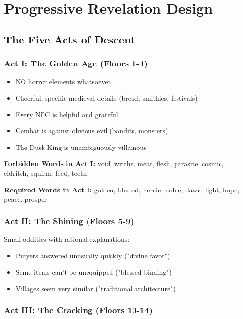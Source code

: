 \documentclass[11pt,a4paper,twoside]{book}
\begin{document}
\chapter{Progressive Revelation Design}

\section{The Five Acts of Descent}

\subsection{Act I: The Golden Age (Floors 1-4)}

\begin{tcolorbox}[heroicbox={Design Principles}]
\begin{itemize}
    \item NO horror elements whatsoever
    \item Cheerful, specific medieval details (bread, smithies, festivals)
    \item Every NPC is helpful and grateful
    \item Combat is against obvious evil (bandits, monsters)
    \item The Dusk King is unambiguously villainous
\end{itemize}
\end{tcolorbox}

\textbf{Forbidden Words in Act I:}
void, writhe, meat, flesh, parasite, cosmic, eldritch, squirm, feed, teeth

\textbf{Required Words in Act I:}
golden, blessed, heroic, noble, dawn, light, hope, peace, prosper

\subsection{Act II: The Shining (Floors 5-9)}

Small oddities with rational explanations:
\begin{itemize}
    \item Prayers answered unusually quickly ("divine favor")
    \item Some items can't be unequipped ("blessed binding")
    \item Villages seem very similar ("traditional architecture")
\end{itemize}

\subsection{Act III: The Cracking (Floors 10-14)}
\end{document}
